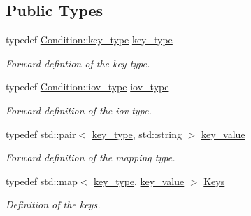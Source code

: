 \subsection*{Public Types}
\begin{DoxyCompactItemize}
\item 
typedef \hyperlink{class_d_d4hep_1_1_conditions_1_1_condition_a7528efa762e8cc072ef80ea67c3531f9}{Condition\+::key\+\_\+type} \hyperlink{class_d_d4hep_1_1_conditions_1_1_interna_1_1_condition_container_a7a4545b4b0536565feb7346bd97c63fa}{key\+\_\+type}
\begin{DoxyCompactList}\small\item\em Forward defintion of the key type. \end{DoxyCompactList}\item 
typedef \hyperlink{class_d_d4hep_1_1_conditions_1_1_condition_ad84300e226b2085ec5e9db7f47be5539}{Condition\+::iov\+\_\+type} \hyperlink{class_d_d4hep_1_1_conditions_1_1_interna_1_1_condition_container_aa697bd92da7a05031b5eef63bb9f000b}{iov\+\_\+type}
\begin{DoxyCompactList}\small\item\em Forward definition of the iov type. \end{DoxyCompactList}\item 
typedef std\+::pair$<$ \hyperlink{class_d_d4hep_1_1_conditions_1_1_interna_1_1_condition_container_a7a4545b4b0536565feb7346bd97c63fa}{key\+\_\+type}, std\+::string $>$ \hyperlink{class_d_d4hep_1_1_conditions_1_1_interna_1_1_condition_container_a2a8452e68d48eb94553607e7d7ae13f6}{key\+\_\+value}
\begin{DoxyCompactList}\small\item\em Forward definition of the mapping type. \end{DoxyCompactList}\item 
typedef std\+::map$<$ \hyperlink{class_d_d4hep_1_1_conditions_1_1_interna_1_1_condition_container_a7a4545b4b0536565feb7346bd97c63fa}{key\+\_\+type}, \hyperlink{class_d_d4hep_1_1_conditions_1_1_interna_1_1_condition_container_a2a8452e68d48eb94553607e7d7ae13f6}{key\+\_\+value} $>$ \hyperlink{class_d_d4hep_1_1_conditions_1_1_interna_1_1_condition_container_a01f9461850ee260a6c76646f9619c8bb}{Keys}
\begin{DoxyCompactList}\small\item\em Definition of the keys. \end{DoxyCompactList}\end{DoxyCompactItemize}
